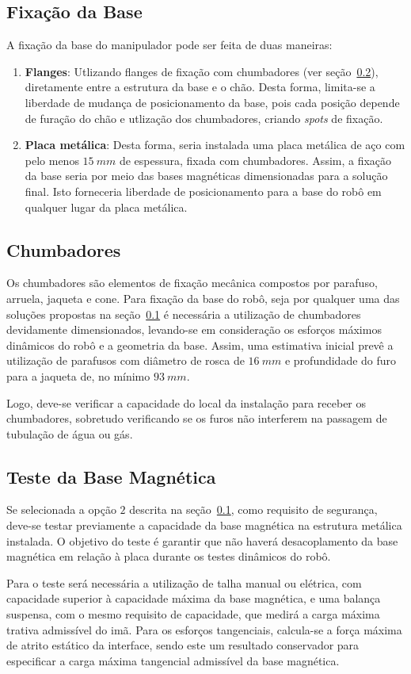 \subsection{Fixação da Base}\label{sec::fix_base}

A fixação da base do manipulador pode ser feita de duas maneiras:

\begin{enumerate}
  \item \textbf{Flanges}: Utlizando flanges de fixação com chumbadores (ver
  seção~\ref{sec::chumbadores}), diretamente entre a estrutura da base e o chão.
  Desta forma, limita-se a liberdade de mudança de posicionamento da base, pois 
  cada posição depende de furação do chão e utlização dos chumbadores, criando \textit{spots} de fixação.
  \item \textbf{Placa metálica}: Desta forma, seria instalada uma placa metálica
  de aço com pelo menos $15~mm$ de espessura, fixada com chumbadores. Assim, a
  fixação da base seria por meio das bases magnéticas dimensionadas para
  a solução final. Isto forneceria liberdade de posicionamento para a base do
  robô em qualquer lugar da placa metálica.
\end{enumerate}

 
 \subsection{Chumbadores}\label{sec::chumbadores}
 
 Os chumbadores são elementos de fixação mecânica compostos por parafuso,
 arruela, jaqueta e cone.
 Para fixação da base do robô, seja por qualquer uma
 das soluções propostas na seção~\ref{sec::fix_base} é necessária a utilização 
 de chumbadores devidamente dimensionados, levando-se em consideração os
 esforços  máximos dinâmicos do robô e a geometria da base.
 Assim, uma estimativa inicial prevê a utilização de parafusos com diâmetro de
 rosca de $16~mm$ e profundidade do furo para a jaqueta de, no mínimo $93~mm$.
 
 Logo, deve-se verificar a capacidade do local da instalação para receber os
 chumbadores, sobretudo verificando se os furos não interferem na passagem de
 tubulação de água ou gás.
 
 \subsection{Teste da Base Magnética}
 
 Se selecionada a opção $2$ descrita na seção~\ref{sec::fix_base}, como
 requisito de segurança, deve-se testar previamente a capacidade da base
 magnética na estrutura metálica instalada.
 O objetivo do teste é garantir que não haverá desacoplamento da base magnética
 em relação à placa durante os testes dinâmicos do robô.
 
 Para o teste será necessária a utilização de talha manual ou elétrica, com
 capacidade superior à capacidade máxima da base magnética, e uma balança
 suspensa, com o mesmo requisito de capacidade, que medirá a carga máxima
 trativa admissível do imã. 
 Para os esforços tangenciais, calcula-se a força máxima de atrito estático da
 interface, sendo este um resultado conservador para especificar a carga máxima
 tangencial admissível da base magnética.